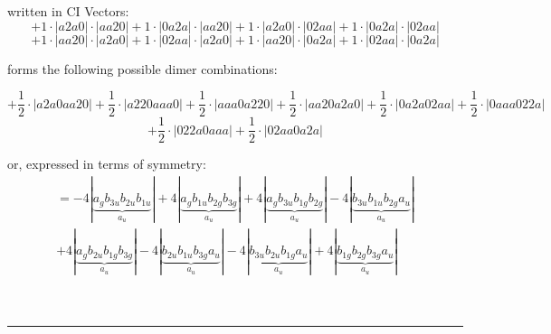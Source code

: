 \documentclass{article}
\begin{document}
\begin{minipage}{\linewidth}
written in CI Vectors: 
 $$+ 1 \cdot \left|a2a0 \right| \cdot \left| aa20 \right| 
+ 1 \cdot \left|0a2a \right| \cdot \left| aa20 \right| 
+ 1 \cdot \left|a2a0 \right| \cdot \left| 02aa \right| 
+ 1 \cdot \left|0a2a \right| \cdot \left| 02aa \right| 
 $$ $$ + 1 \cdot \left|aa20 \right| \cdot \left| a2a0 \right| 
+ 1 \cdot \left|02aa \right| \cdot \left| a2a0 \right| 
+ 1 \cdot \left|aa20 \right| \cdot \left| 0a2a \right| 
+ 1 \cdot \left|02aa \right| \cdot \left| 0a2a \right| 
$$



 forms the following possible dimer combinations:

$$+ \frac{1}{2} \cdot \left|a2a0aa20 \right| + \frac{1}{2} \cdot \left|a220aaa0 \right| + \frac{1}{2} \cdot \left|aaa0a220 \right| + \frac{1}{2} \cdot \left|aa20a2a0 \right| + \frac{1}{2} \cdot \left|0a2a02aa \right| + \frac{1}{2} \cdot \left|0aaa022a \right|  $$ $$ + \frac{1}{2} \cdot \left|022a0aaa \right| + \frac{1}{2} \cdot \left|02aa0a2a \right| $$



\end{minipage}
\vspace{0.5cm}


or, expressed in terms of symmetry:\begin{multline*}
=-4\left|\underbrace{a_{g} b_{3u} b_{2u} b_{1u}}_{a_{u}}\right|+4\left|\underbrace{a_{g} b_{1u} b_{2g} b_{3g}}_{a_{u}}\right|+4\left|\underbrace{a_{g} b_{3u} b_{1g} b_{2g}}_{a_{u}}\right|-4\left|\underbrace{b_{3u} b_{1u} b_{2g} a_{u}}_{a_{u}}\right|\\
+4\left|\underbrace{a_{g} b_{2u} b_{1g} b_{3g}}_{a_{u}}\right|-4\left|\underbrace{b_{2u} b_{1u} b_{3g} a_{u}}_{a_{u}}\right|-4\left|\underbrace{b_{3u} b_{2u} b_{1g} a_{u}}_{a_{u}}\right|+4\left|\underbrace{b_{1g} b_{2g} b_{3g} a_{u}}_{a_{u}}\right|
\end{multline*}\\\\

 


\hrule
\vspace{0.5cm}
\end{document}
